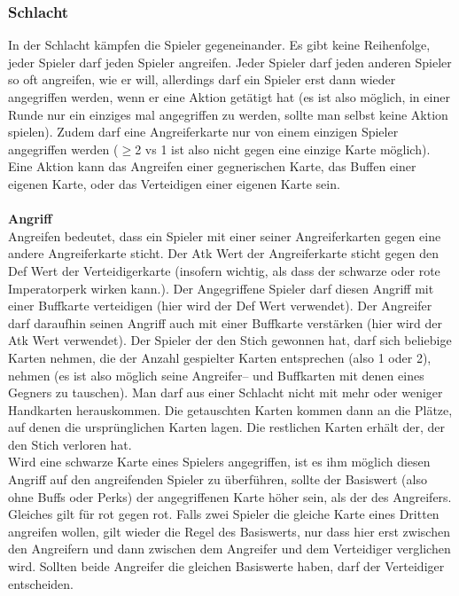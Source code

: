 \documentclass[a4paper,12pt]{article}
\numberwithin{equation}{section}
\begin{document}
\subsubsection{Schlacht}
In der Schlacht kämpfen die Spieler gegeneinander.
Es gibt keine Reihenfolge, jeder Spieler darf jeden Spieler angreifen.
Jeder Spieler darf jeden anderen Spieler so oft angreifen, wie er will, allerdings darf ein Spieler erst dann wieder angegriffen werden, wenn er eine Aktion getätigt hat (es ist also möglich, in einer Runde nur ein einziges mal angegriffen zu werden, sollte man selbst keine Aktion spielen).
Zudem darf eine Angreiferkarte nur von einem einzigen Spieler angegriffen werden ($\geq $2 vs 1 ist also nicht gegen eine einzige Karte möglich).
Eine Aktion kann das Angreifen einer gegnerischen Karte, das Buffen einer eigenen Karte, oder das Verteidigen einer eigenen Karte sein.\\\\
\textbf{Angriff}\\
Angreifen bedeutet, dass ein Spieler mit einer seiner Angreiferkarten gegen eine andere Angreiferkarte sticht.
Der Atk Wert der Angreiferkarte sticht gegen den Def Wert der Verteidigerkarte (insofern wichtig, als dass der schwarze oder rote Imperatorperk wirken kann.).
Der Angegriffene Spieler darf diesen Angriff mit einer Buffkarte verteidigen (hier wird der Def Wert verwendet).
Der Angreifer darf daraufhin seinen Angriff auch mit einer Buffkarte verstärken (hier wird der Atk Wert verwendet).
Der Spieler der den Stich gewonnen hat, darf sich beliebige Karten nehmen, die der Anzahl gespielter Karten entsprechen (also 1 oder 2), nehmen (es ist also möglich seine Angreifer-- und Buffkarten mit denen eines Gegners zu tauschen).
Man darf aus einer Schlacht nicht mit mehr oder weniger Handkarten herauskommen.
Die getauschten Karten kommen dann an die Plätze, auf denen die ursprünglichen Karten lagen.
Die restlichen Karten erhält der, der den Stich verloren hat.\\\indent
Wird eine schwarze Karte eines Spielers angegriffen, ist es ihm möglich diesen Angriff auf den angreifenden Spieler zu überführen, sollte der Basiswert (also ohne Buffs oder Perks) der angegriffenen Karte höher sein, als der des Angreifers.
Gleiches gilt für rot gegen rot.
Falls zwei Spieler die gleiche Karte eines Dritten angreifen wollen, gilt wieder die Regel des Basiswerts, nur dass hier erst zwischen den Angreifern und dann zwischen dem Angreifer und dem Verteidiger verglichen wird.
Sollten beide Angreifer die gleichen Basiswerte haben, darf der Verteidiger entscheiden.
\end{document}
